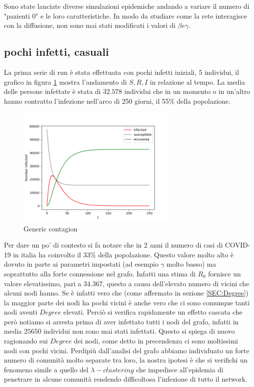 \documentclass[a4paper]{article}
\begin{document}
Sono state lanciate diverse simulazioni epidemiche andando a variare il numero di "pazienti 0" e le loro caratteristiche.
In modo da studiare come la rete interagisce con la diffusione, non sono mai stati modificati i valori di $\beta e \gamma$.\\

\subsection{pochi infetti, casuali}
La prima serie di run è stata effettuata con pochi infetti iniziali, 5 individui, il grafico in figura \ref{FIG:generic} mostra l'andamento di $S, R, I$ in relazione al tempo.
La media delle persone infettate è stata di $32.578$ individui che in un momento o in un'altro hanno contratto l'infezione nell'arco di 250 giorni, il 55\% della popolazione.\\
\begin{figure}[!ht]
\centering
\includegraphics[width=0.7\textwidth]{generic_run.png}
\caption{Generic contagion} \label{FIG:generic}
\end{figure}

Per dare un po' di contesto si fa notare che in 2 anni il numero di casi di COVID-19 in italia ha coinvolto il 33\% della popolazione.
Questo valore molto alto è dovuto in parte ai parametri impostati (ad esempio $\gamma$ molto basso) ma soprattutto alla forte connessione nel grafo.
Infatti una stima di $R_0$ fornisce un valore elevatissimo, pari a $34.367$, questo a causa dell'elevato numero di vicini che alcuni nodi hanno.
Se è infatti vero che (come affermato in sezione \ref{SEC:Degree}) la maggior parte dei nodi ha pochi vicini è anche vero che ci sono comunque tanti nodi aventi $Degree$ elevati.
Perciò si verifica rapidamente un effetto cascata che però notiamo si arresta prima di aver infettato tutti i nodi del grafo, infatti in media $25650$ individui non sono mai stati infettati.
Questo si spiega di nuovo ragionando sui $Degree$ dei nodi, come detto in precendenza ci sono moltissimi nodi con pochi vicini.
Perdipiù dall'analisi del grafo abbiamo individuato un forte numero di comunità molto separate tra loro, la nostra ipotesi è che si verifichi un fenomeno simile a quello del $\lambda - clustering$ che impedisce all'epidemia di penetrare in alcune comunità rendendo difficoltosa l'infezione di tutto il network.
\end{document}
